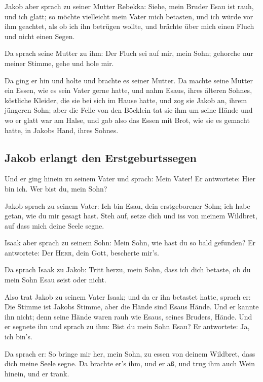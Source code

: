  Jakob aber sprach zu seiner Mutter Rebekka: Siehe, mein
Bruder Esau ist rauh, und ich glatt;  so möchte
vielleicht mein Vater mich betasten, und ich würde vor ihm geachtet, als
ob ich ihn betrügen wollte, und brächte über mich einen Fluch und nicht
einen Segen.

 Da sprach seine Mutter zu ihm: Der Fluch sei auf mir,
mein Sohn; gehorche nur meiner Stimme, gehe und hole mir.

 Da ging er hin und holte und brachte es seiner Mutter.
Da machte seine Mutter ein Essen, wie es sein Vater gerne hatte,
 und nahm Esaus, ihres älteren Sohnes, köstliche Kleider,
die sie bei sich im Hause hatte, und zog sie Jakob an, ihrem jüngeren
Sohn;  aber die Felle von den Böcklein tat sie ihm um
seine Hände und wo er glatt war am Halse,  und gab also
das Essen mit Brot, wie sie es gemacht hatte, in Jakobs Hand, ihres
Sohnes.

\hypertarget{jakob-erlangt-den-erstgeburtssegen}{%
\subsection{Jakob erlangt den
Erstgeburtssegen}\label{jakob-erlangt-den-erstgeburtssegen}}

 Und er ging hinein zu seinem Vater und sprach: Mein
Vater! Er antwortete: Hier bin ich. Wer bist du, mein Sohn?

 Jakob sprach zu seinem Vater: Ich bin Esau, dein
erstgeborener Sohn; ich habe getan, wie du mir gesagt hast. Steh auf,
setze dich und iss von meinem Wildbret, auf dass mich deine Seele segne.

 Isaak aber sprach zu seinem Sohn: Mein Sohn, wie hast du
so bald gefunden? Er antwortete: Der \textsc{Herr}, dein Gott, bescherte
mir's.

 Da sprach Isaak zu Jakob: Tritt herzu, mein Sohn, dass
ich dich betaste, ob du mein Sohn Esau seist oder nicht.

 Also trat Jakob zu seinem Vater Isaak; und da er ihn
betastet hatte, sprach er: Die Stimme ist Jakobs Stimme, aber die Hände
sind Esaus Hände.  Und er kannte ihn nicht; denn seine
Hände waren rauh wie Esaus, seines Bruders, Hände. Und er segnete ihn
 und sprach zu ihm: Bist du mein Sohn Esau? Er
antwortete: Ja, ich bin's.

 Da sprach er: So bringe mir her, mein Sohn, zu essen von
deinem Wildbret, dass dich meine Seele segne. Da brachte er's ihm, und
er aß, und trug ihm auch Wein hinein, und er trank.

